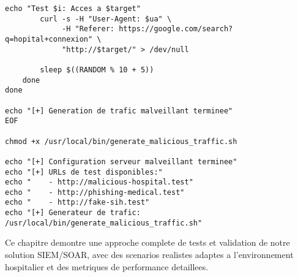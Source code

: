 \begin{lstlisting}[style=bashstyle,caption=Configuration serveur web malveillant pour tests]
        echo "Test $i: Acces a $target"
        curl -s -H "User-Agent: $ua" \
             -H "Referer: https://google.com/search?q=hopital+connexion" \
             "http://$target/" > /dev/null
        
        sleep $((RANDOM % 10 + 5))
    done
done

echo "[+] Generation de trafic malveillant terminee"
EOF

chmod +x /usr/local/bin/generate_malicious_traffic.sh

echo "[+] Configuration serveur malveillant terminee"
echo "[+] URLs de test disponibles:"
echo "    - http://malicious-hospital.test"
echo "    - http://phishing-medical.test"  
echo "    - http://fake-sih.test"
echo "[+] Generateur de trafic: /usr/local/bin/generate_malicious_traffic.sh"
\end{lstlisting}

Ce chapitre demontre une approche complete de tests et validation de notre solution SIEM/SOAR, avec des scenarios realistes adaptes a l'environnement hospitalier et des metriques de performance detaillees.
